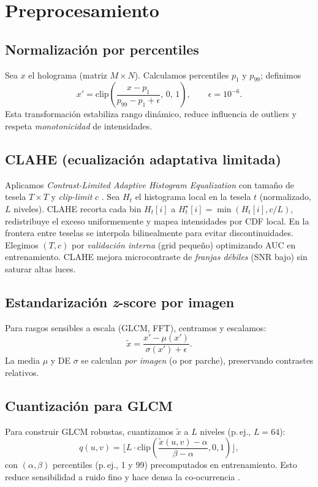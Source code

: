\section{Preprocesamiento}
\label{sec:preproc}

\subsection{Normalización por percentiles}
Sea $x$ el holograma (matriz $M\times N$). Calculamos percentiles $p_1$ y $p_{99}$; definimos
\begin{equation}
x'=\mathrm{clip}\!\left(\frac{x-p_1}{p_{99}-p_1+\epsilon},\,0,\,1\right),\qquad \epsilon=10^{-6}.
\end{equation}
Esta transformación estabiliza rango dinámico, reduce influencia de outliers y respeta \emph{monotonicidad} de intensidades.

\subsection{CLAHE (ecualización adaptativa limitada)}
Aplicamos \emph{Contrast-Limited Adaptive Histogram Equalization} con tamaño de tesela $T\times T$ y \emph{clip-limit} $c$ \cite{Zhou2019MedImageContrast}. Sea $H_t$ el histograma local en la tesela $t$ (normalizado, $L$ niveles). CLAHE recorta cada bin $H_t[i]$ a $H^\star_t[i]=\min(H_t[i],c/L)$, redistribuye el exceso uniformemente y mapea intensidades por CDF local. En la frontera entre teselas se interpola bilinealmente para evitar discontinuidades. Elegimos $(T,c)$ por \emph{validación interna} (grid pequeño) optimizando AUC en entrenamiento. CLAHE mejora microcontraste de \emph{franjas débiles} (SNR bajo) sin saturar altas luces.

\subsection{Estandarización \emph{z}-score por imagen}
Para rasgos sensibles a escala (GLCM, FFT), centramos y escalamos:
\begin{equation}
\tilde{x}=\frac{x'-\mu(x')}{\sigma(x')+\epsilon}.
\end{equation}
La media $\mu$ y DE $\sigma$ se calculan \emph{por imagen} (o por parche), preservando contrastes relativos.

\subsection{Cuantización para GLCM}
Para construir GLCM robustas, cuantizamos $\tilde{x}$ a $L$ niveles (p.\,ej., $L=64$):
\[
q(u,v)=\big\lfloor L\cdot \mathrm{clip}\left(\frac{\tilde{x}(u,v)-\alpha}{\beta-\alpha},0,1\right)\big\rfloor,
\]
con $(\alpha,\beta)$ percentiles (p.\,ej., 1 y 99) precomputados en entrenamiento. Esto reduce sensibilidad a ruido fino y hace densa la co-ocurrencia \cite{Kiani2022TextureSurvey}.


